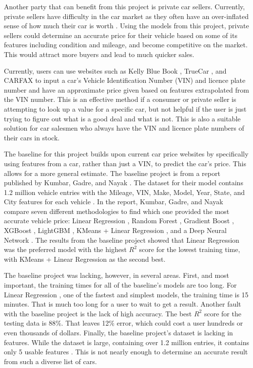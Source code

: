 \documentclass[compsoc]{IEEEtran}
\begin{document}
Another party that can benefit from this project is private car sellers. Currently, private sellers have difficulty in the car market as they often have an over-inflated sense of how much their car is worth \cite{website:private_seller}. Using the models from this project, private sellers could determine an accurate price for their vehicle based on some of its features including condition and mileage, and become competitive on the market. This would attract more buyers and lead to much quicker sales.

Currently, users can use websites such as Kelly Blue Book \cite{website:kbb}, TrueCar \cite{website:truecar}, and CARFAX \cite{website:carfax} to input a car's Vehicle Identification Number (VIN) and licence plate number and have an approximate price given based on features extrapolated from the VIN number. This is an effective method if a consumer or private seller is attempting to look up a value for a specific car, but not helpful if the user is just trying to figure out what is a good deal and what is not. This is also a suitable solution for car salesmen who always have the VIN and licence plate numbers of their cars in stock.

The baseline for this project builds upon current car price websites by specifically using features from a car, rather than just a VIN, to predict the car's price. This allows for a more general estimate. The baseline project is from a report published by Kumbar, Gadre, and Nayak \cite{baseline}. The dataset for their model contains 1.2 million vehicle entries with the Mileage, VIN, Make, Model, Year, State, and City features for each vehicle \cite{original_dataset}. In the report, Kumbar, Gadre, and Nayak compare seven different methodologies to find which one provided the most accurate vehicle price: Linear Regression \cite{model:multiple_linear_regression}, Random Forest \cite{model:random_forest}, Gradient Boost \cite{model:gradient_boost}, XGBoost \cite{model:xg_boost}, LightGBM \cite{model:light_gbm}, KMeans + Linear Regression \cite{model:kmeans_linear_regression}, and a Deep Neural Network \cite{model:neural_network}. The results from the baseline project showed that Linear Regression was the preferred model with the highest $R^2$ score for the lowest training time, with KMeans + Linear Regression as the second best.

The baseline project was lacking, however, in several areas. First, and most important, the training times for all of the baseline's models are too long. For Linear Regression \cite{model:kmeans_linear_regression}, one of the fastest and simplest models, the training time is 15 minutes. That is much too long for a user to wait to get a result. Another fault with the baseline project is the lack of high accuracy. The best $R^2$ score for the testing data is 88\%. That leaves 12\% error, which could cost a user hundreds or even thousands of dollars. Finally, the baseline project's dataset is lacking in features. While the dataset is large, containing over 1.2 million entries, it contains only 5 usable features \cite{original_dataset}. This is not nearly enough to determine an accurate result from such a diverse list of cars.
\end{document}
